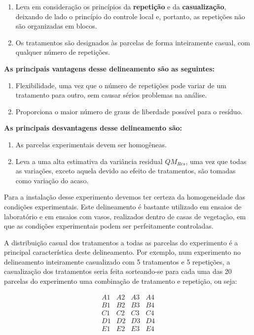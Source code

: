 \documentclass[
]{book}
\begin{document}
\begin{enumerate}
\def\labelenumi{\arabic{enumi}.}
\item
  Leva em consideração os princípios da \textbf{repetição} e da \textbf{casualização}, deixando de lado o princípio do controle local e, portanto, as repetições não são organizadas em blocos.
\item
  Os tratamentos são designados às parcelas de forma inteiramente casual, com qualquer número de repetições.
\end{enumerate}

\textbf{As principais vantagens desse delineamento são as seguintes:}

\begin{enumerate}
\def\labelenumi{\arabic{enumi})}
\item
  Flexibilidade, uma vez que o número de repetições pode variar de um tratamento para outro, sem causar sérios problemas na análise.
\item
  Proporciona o maior número de graus de liberdade possível para o resíduo.
\end{enumerate}

\textbf{As principais desvantagens desse delineamento são:}

\begin{enumerate}
\def\labelenumi{\arabic{enumi})}
\item
  As parcelas experimentais devem ser homogêneas.
\item
  Leva a uma alta estimativa da variância residual \(QM_{Res}\), uma vez que todas as variações, exceto aquela devido ao efeito de tratamentos, são tomadas como variação do acaso.
\end{enumerate}

Para a instalação desse experimento devemos ter certeza da homogeneidade das condições experimentais. Este delineamento é bastante utilizado em ensaios de laboratório e em ensaios com vasos, realizados dentro de casas de vegetação, em que as condições experimentais podem ser perfeitamente controladas.

A distribuição casual dos tratamentos a todas as parcelas do experimento é a principal característica deste delineamento. Por exemplo, num experimento no delineamento inteiramente casualizado com 5 tratamentos e 5 repetições, a casualização dos tratamentos seria feita sorteando-se para cada uma das 20 parcelas do experimento uma combinação de tratamento e repetição, ou seja:

\[
\begin{matrix}
A1 & A2 & A3 & A4 \\
B1 & B2 & B3 & B4 \\
C1 & C2 & C3 & C4 \\
D1 & D2 & D3 & D4 \\
E1 & E2 & E3 & E4 
\end{matrix}
\]
\end{document}
